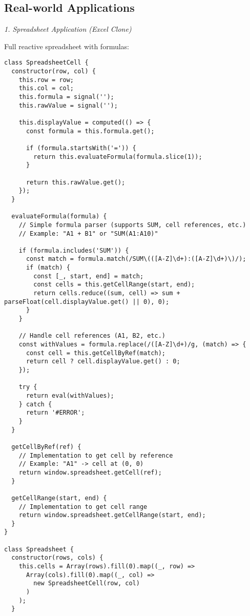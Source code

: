 \documentclass[11pt]{article}
\begin{document}
\subsection{Real-world Applications}
\label{sec:org35e889c}

\emph{1. Spreadsheet Application (Excel Clone)}

Full reactive spreadsheet with formulas:

\begin{verbatim}
class SpreadsheetCell {
  constructor(row, col) {
    this.row = row;
    this.col = col;
    this.formula = signal('');
    this.rawValue = signal('');
    
    this.displayValue = computed(() => {
      const formula = this.formula.get();
      
      if (formula.startsWith('=')) {
        return this.evaluateFormula(formula.slice(1));
      }
      
      return this.rawValue.get();
    });
  }
  
  evaluateFormula(formula) {
    // Simple formula parser (supports SUM, cell references, etc.)
    // Example: "A1 + B1" or "SUM(A1:A10)"
    
    if (formula.includes('SUM')) {
      const match = formula.match(/SUM\(([A-Z]\d+):([A-Z]\d+)\)/);
      if (match) {
        const [_, start, end] = match;
        const cells = this.getCellRange(start, end);
        return cells.reduce((sum, cell) => sum + parseFloat(cell.displayValue.get() || 0), 0);
      }
    }
    
    // Handle cell references (A1, B2, etc.)
    const withValues = formula.replace(/([A-Z]\d+)/g, (match) => {
      const cell = this.getCellByRef(match);
      return cell ? cell.displayValue.get() : 0;
    });
    
    try {
      return eval(withValues);
    } catch {
      return '#ERROR';
    }
  }
  
  getCellByRef(ref) {
    // Implementation to get cell by reference
    // Example: "A1" -> cell at (0, 0)
    return window.spreadsheet.getCell(ref);
  }
  
  getCellRange(start, end) {
    // Implementation to get cell range
    return window.spreadsheet.getCellRange(start, end);
  }
}

class Spreadsheet {
  constructor(rows, cols) {
    this.cells = Array(rows).fill(0).map((_, row) =>
      Array(cols).fill(0).map((_, col) =>
        new SpreadsheetCell(row, col)
      )
    );
  }
  

\end{verbatim}
\end{document}
